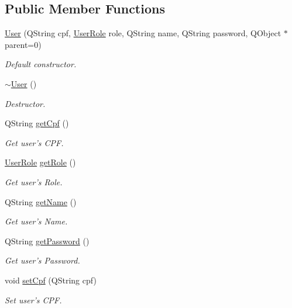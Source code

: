 \subsection*{\-Public \-Member \-Functions}
\begin{DoxyCompactItemize}
\item 
\hyperlink{class_user_a3f4c4c6996209aa3a40c131cfa264698}{\-User} (\-Q\-String cpf, \hyperlink{class_user_a43f49d6a3bf5f000aea476bc641949b0}{\-User\-Role} role, \-Q\-String name, \-Q\-String password, \-Q\-Object $\ast$parent=0)
\begin{DoxyCompactList}\small\item\em \-Default constructor. \end{DoxyCompactList}\item 
\hyperlink{class_user_ac00b72ad64eb4149f7b21b9f5468c2b2}{$\sim$\-User} ()
\begin{DoxyCompactList}\small\item\em \-Destructor. \end{DoxyCompactList}\item 
\-Q\-String \hyperlink{class_user_a96fb32bc43251b22da3b05f1b65ea89c}{get\-Cpf} ()
\begin{DoxyCompactList}\small\item\em \-Get user's \-C\-P\-F. \end{DoxyCompactList}\item 
\hyperlink{class_user_a43f49d6a3bf5f000aea476bc641949b0}{\-User\-Role} \hyperlink{class_user_a9894d40a8d8b99682d93ec1cb4305cd3}{get\-Role} ()
\begin{DoxyCompactList}\small\item\em \-Get user's \-Role. \end{DoxyCompactList}\item 
\-Q\-String \hyperlink{class_user_a08223b0b137e3fc264d94f2d746a4fc9}{get\-Name} ()
\begin{DoxyCompactList}\small\item\em \-Get user's \-Name. \end{DoxyCompactList}\item 
\-Q\-String \hyperlink{class_user_a96d673c7c62ecdfdd4c509db8350262d}{get\-Password} ()
\begin{DoxyCompactList}\small\item\em \-Get user's \-Password. \end{DoxyCompactList}\item 
void \hyperlink{class_user_ab49ad34cb5981d0b646078f8695c6260}{set\-Cpf} (\-Q\-String cpf)
\begin{DoxyCompactList}\small\item\em \-Set user's \-C\-P\-F. \end{DoxyCompactList}\item 

\end{DoxyCompactItemize}
